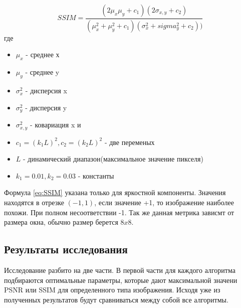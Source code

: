 \begin{equation}\label{eq:SSIM}
SSIM = \frac{(2\mu_x\mu_y+c_1)(2\sigma_{x,y}+c_2)}{(\mu_x^2+\mu_y^2+c_1)(\sigma_x^2+sigma_y^2+c_2))}
\end{equation}
где
\begin{itemize}
	\item $\mu_x$ - среднее х
	\item $\mu_y$ - среднее y
	\item $\sigma_x^2$ - дисперсия x
	\item $\sigma_y^2$ - дисперсия y
	\item $\sigma_{x,y}^2$ - ковариация x и \item $c_1=(k_1L)^2, c_2=(k_2L)^2$ - две переменых
	\item $L$ - динамический диапазон(максимальное значение пикселя)  
	\item $k_1=0.01, k_2=0.03$ - константы
\end{itemize}
Формула \ref{eq:SSIM} указана только для яркостной компоненты. Значения находятся в отрезке $(-1,1)$, если значение +1, то изображение наиболее похожи. При полном несоответствии -1. Так же данная метрика зависмт от размера окна, обычно размер берется $8x8$.\
\subsection{Результаты исследования}
Исследование разбито на две части. В первой части для каждого алгоритма подбираются оптимальные параметры, которые дают максимальной значени PSNR или SSIM для определенного типа изображения. Исходя уже из полученных результатов будут сравниваться между собой все алгоритмы.
